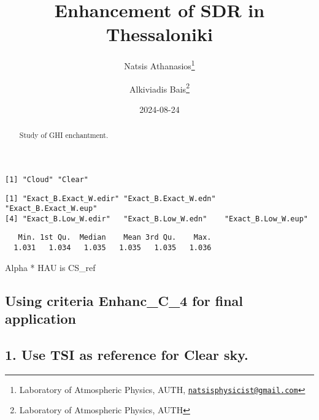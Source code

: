 \documentclass[
  10pt,
  a4paper,oneside]{article}
\title{Enhancement of SDR in Thessaloniki}
\author{Natsis Athanasios\footnote{Laboratory of Atmospheric Physics, AUTH, \href{mailto:natsisphysicist@gmail.com}{\nolinkurl{natsisphysicist@gmail.com}}} \and Alkiviadis Bais\footnote{Laboratory of Atmospheric Physics, AUTH}}
\date{2024-08-24}
\begin{document}
\maketitle
\begin{abstract}
Study of GHI enchantment.
\end{abstract}

{
\hypersetup{linkcolor=}
\setcounter{tocdepth}{4}
\tableofcontents
}
\begin{verbatim}
[1] "Cloud" "Clear"
\end{verbatim}

\begin{verbatim}
[1] "Exact_B.Exact_W.edir" "Exact_B.Exact_W.edn"  "Exact_B.Exact_W.eup" 
[4] "Exact_B.Low_W.edir"   "Exact_B.Low_W.edn"    "Exact_B.Low_W.eup"   
\end{verbatim}

\begin{verbatim}
   Min. 1st Qu.  Median    Mean 3rd Qu.    Max. 
  1.031   1.034   1.035   1.035   1.035   1.036 
\end{verbatim}

Alpha * HAU is CS\_ref

\hypertarget{using-criteria-enhanc_c_4-for-final-application}{%
\subsection{\texorpdfstring{Using criteria \textbf{Enhanc\_C\_4} for final application}{Using criteria Enhanc\_C\_4 for final application}}\label{using-criteria-enhanc_c_4-for-final-application}}

\hypertarget{use-tsi-as-reference-for-clear-sky.}{%
\subsection{1. Use TSI as reference for Clear sky.}\label{use-tsi-as-reference-for-clear-sky.}}
\end{document}
